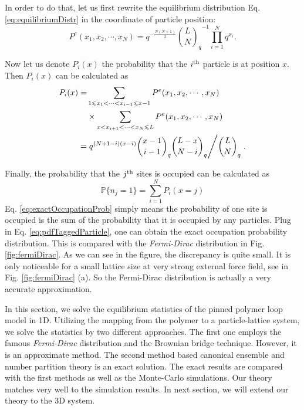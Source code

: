 In order to do that, let us first rewrite the equilibrium distribution Eq. \eqref{eq:equilibriumDistr} in the coordinate of particle position:
\begin{equation}
    \label{eq:equilibriumDistrPos}
    P^e(x_1, x_2, \cdots, x_N) = q^{-\frac{N(N+1)}{2}} {\binom{L}{N}_q}^{-1}\prod_{i=1}^N q^{x_i}.
\end{equation}

Now let us denote $P_i(x)$ the probability that the $i^{\rm{th}}$ particle is at position $x$. Then $P_i(x)$ can be calculated as 
\begin{equation}
    \begin{aligned}
        \label{eq:pdfTaggedParticle}
        P_i(x) = & \sum_{1 \leqslant x_1<\cdots<x_{i-1}\leqslant x-1}P^e(x_1, x_2, \cdots, x_N) \\
        &\times \sum_{x<x_{i+1}<\cdots<x_{N}\leqslant L}P^e(x_1, x_2, \cdots, x_N) \\
        = & \left. q^{(N+1-i)(x-i)} \binom{x-1}{i-1}_q\binom{L-x}{N-i}_q 
            \middle/  \binom{L}{N}_q \right..
    \end{aligned}
\end{equation}

Finally, the probability that the $j^{\rm{th}}$ sites is occupied can be calculated as
\begin{equation}
    \label{eq:exactOccupationProb}
    \mathbb{P}\{n_j=1\} = \sum_{i=1}^N P_i(x=j) 
\end{equation}
Eq. \eqref{eq:exactOccupationProb} simply means the probability of one site is occupied is the sum of the probability that it is occupied by any particles. Plug in Eq. \eqref{eq:pdfTaggedParticle}, one can obtain the exact occupation probability distribution. This is compared with the \emph{Fermi-Dirac} distribution in Fig. \ref{fig:fermiDirac}. As we can see in the figure, the discrepancy is quite small. It is only noticeable for a small lattice size at very strong external force field, see in Fig. \ref{fig:fermiDirac} (a). So the Fermi-Dirac distribution is actually a very accurate approximation. 


In this section, we solve the equilibrium statistics of the pinned polymer loop model in 1D. Utilizing the mapping from the polymer to a particle-lattice system, we solve the statistics by two different approaches. The first one employs the famous \emph{Fermi-Dirac} distribution and the Brownian bridge technique. However, it is an approximate method. The second method based canonical ensemble and number partition theory is an exact solution. The exact results are compared with the first methods as well as the Monte-Carlo simulations. Our theory matches very well to the simulation results. In next section, we will extend our theory to the 3D system. 




